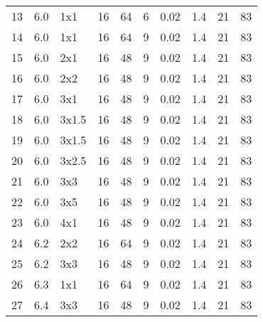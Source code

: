 \begin{center}
\begin{tabular}{l | c | l | l l l l l l l}
        13  & 6.0    & 1x1       & 16    & 64       & 6      & 0.02             & 1.4                  & 21               & 83    \\ 
        14  & 6.0    & 1x1       & 16    & 64       & 9      & 0.02             & 1.4                  & 21               & 83    \\ 
        15  & 6.0    & 2x1       & 16    & 48       & 9      & 0.02             & 1.4                  & 21               & 83    \\ 
        16  & 6.0    & 2x2       & 16    & 48       & 9      & 0.02             & 1.4                  & 21               & 83    \\ 
        17  & 6.0    & 3x1       & 16    & 48       & 9      & 0.02             & 1.4                  & 21               & 83    \\ 
        18  & 6.0    & 3x1.5     & 16    & 48       & 9      & 0.02             & 1.4                  & 21               & 83    \\ 
        19  & 6.0    & 3x1.5     & 16    & 48       & 9      & 0.02             & 1.4                  & 21               & 83    \\ 
        20  & 6.0    & 3x2.5     & 16    & 48       & 9      & 0.02             & 1.4                  & 21               & 83    \\ 
        21  & 6.0    & 3x3       & 16    & 48       & 9      & 0.02             & 1.4                  & 21               & 83    \\ 
        22  & 6.0    & 3x5       & 16    & 48       & 9      & 0.02             & 1.4                  & 21               & 83    \\ 
        23  & 6.0    & 4x1       & 16    & 48       & 9      & 0.02             & 1.4                  & 21               & 83    \\ 
        24  & 6.2    & 2x2       & 16    & 64       & 9      & 0.02             & 1.4                  & 21               & 83    \\ 
        25  & 6.2    & 3x3       & 16    & 48       & 9      & 0.02             & 1.4                  & 21               & 83    \\ 
        26  & 6.3    & 1x1       & 16    & 64       & 9      & 0.02             & 1.4                  & 21               & 83    \\ 
        27  & 6.4    & 3x3       & 16    & 48       & 9      & 0.02             & 1.4                  & 21               & 83    \\ 
    \end{tabular}
    \label{tab:parametersSet}
\end{center}

